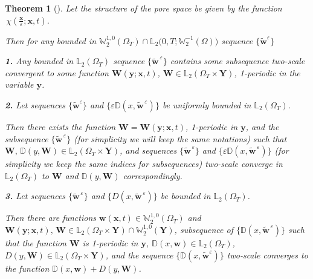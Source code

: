 \documentclass{article}
\theoremstyle{plain}
\newtheorem{theorem}{Theorem}[section]
\theoremstyle{definition}
\numberwithin{equation}{section}
\begin{document}
\begin{theorem}[\cite{17}]\label{t2.5}
Let the structure of the pore space be given by the function  $\displaystyle\,\chi(\frac{\boldsymbol{x}}{\varepsilon};\boldsymbol{x},t)$.

Then for any bounded in $\mathbb{W}^{1,0}_{2}(\Omega_{T})\cap
\mathbb{L}_{2}\big(0,T;\mathbb{W}^{-1}_{2}(\Omega)\big)$ sequence $\{\widetilde{\boldsymbol{w}}^{\varepsilon}\}$

\textbf{1.} Any bounded in $\mathbb{L}_{2}(\Omega_{T})$ sequence $\{\widetilde{\boldsymbol{w}}^{\,\varepsilon}\}$
contains some subsequence two-scale convergent to some function
$\boldsymbol{W}(\boldsymbol{y};\boldsymbol{x},t)$, $\boldsymbol{W}\in\mathbb{L}_{2}
(\Omega_{T}\times \textbf{Y})$, 1-periodic in the variable $\boldsymbol{y}$.

\textbf{2.} Let sequences $\{\widetilde{\boldsymbol{w}}^{\varepsilon}\}$ and $\{\varepsilon\mathbb{D}(x,\widetilde{\boldsymbol{w}}^{\,\varepsilon})\}$ be uniformly bounded in $\mathbb{L}_{2}(\Omega_{T})$.

Then there exists the function $\boldsymbol{W}=\boldsymbol{W}(\boldsymbol{y};\boldsymbol{x},t)$, 1-periodic
in $\boldsymbol{y}$, and the subsequence $\{\widetilde{\boldsymbol{w}}^{\,\varepsilon}\}$ (for simplicity we will keep the same notations) such that
$\boldsymbol{W},\,\mathbb{D}(y,\boldsymbol{W})\in \mathbb{L}_{2}(\Omega_{T}\times\textbf{Y})$,
and sequences $\{\widetilde{\boldsymbol{w}}^{\,\varepsilon}\}$ and $\{\varepsilon\mathbb{D}(x,\widetilde{\boldsymbol{w}}^{\,\varepsilon})\}$ (for simplicity we keep the same indices for subsequences) two-scale converge in
$\mathbb{L}_{2}(\Omega_{T})$ to $\boldsymbol{W}$ and $\mathbb{D}(y,\boldsymbol{W})$ correspondingly.

\textbf{3.} Let sequences $\{\widetilde{\boldsymbol{w}}^{\,\varepsilon}\}$ and
$\{D(x,\widetilde{\boldsymbol{w}}^{\,\varepsilon})\}$ be bounded in $\mathbb{L}_{2}(\Omega_{T})$.

Then there are functions $\boldsymbol{w}(\boldsymbol{x},t)\in \mathbb{W}^{1,0}_{2}(\Omega_{T})$ and
$\boldsymbol{W}(\boldsymbol{y};\boldsymbol{x},t),\,\boldsymbol{W}\in \mathbb{L}_{2}(\Omega_{T}\times \textbf{Y})\cap\mathbb{W}^{1,0}_{2}(\textbf{Y})$,
subsequence of $\{\mathbb{D}(x,\widetilde{\boldsymbol{w}}^{\,\varepsilon})\}$ such that the function
$\boldsymbol{W}$ is 1-periodic in $\boldsymbol{y}$, $\mathbb{D}(x,\boldsymbol{w}) \in \mathbb{L}_{2}(\Omega_{T})$,
$D(y,\boldsymbol{W}) \in \mathbb{L}_{2}(\Omega_{T}\times\textbf{Y})$, and the sequence
$\{\mathbb{D}(x,\widetilde{\boldsymbol{w}}^{\varepsilon})\}$ two-scale converges to the function
$\mathbb{D}(x,\boldsymbol{w})+D(y,\boldsymbol{W})$.
\end{theorem}
\end{document}
